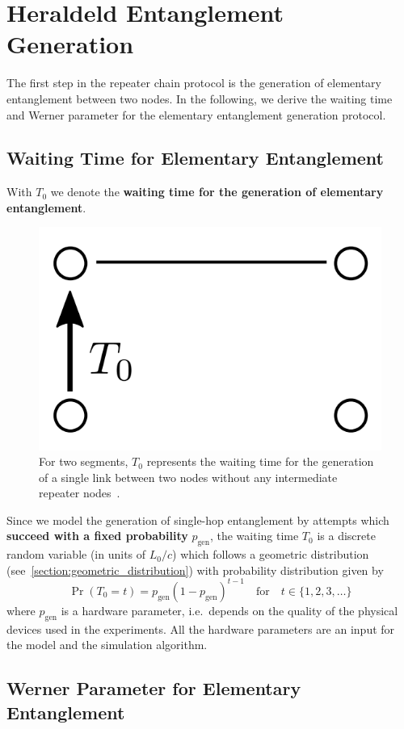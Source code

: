 \documentclass{masterthesis}
\begin{document}
\section{Heraldeld Entanglement Generation}\label{section:heralded_entanglement_generation}

The first step in the repeater chain protocol is the generation of elementary entanglement between two nodes.
In the following, we derive the waiting time and Werner parameter for the elementary entanglement generation protocol.

\subsection{Waiting Time for Elementary Entanglement}

With $T_0$ we denote the \textbf{waiting time for the generation of elementary entanglement}.

\begin{figure}[ht]
    \centering
    \includegraphics[width=0.2\linewidth]{images/gen.png}
    \caption{For two segments, $T_0$ represents the waiting time for the generation of a single link between two nodes without any intermediate repeater nodes~\cite{Li_2021}.}\label{fig:gen}
\end{figure}

Since we model the generation of single-hop entanglement by attempts which \textbf{succeed with a fixed probability} $p_{\text{gen}}$, the waiting time $T_0$ is a discrete random variable (in units of $L_0 /c$) which follows a geometric distribution (see~\ref{section:geometric_distribution}) with probability distribution given by 
\begin{equation}
    \Pr(T_0 = t) = p_{\text{gen}} {(1 - p_{\text{gen}})}^{t-1} \quad \text{for} \quad t \in \{1, 2, 3, \ldots \}
\end{equation}
where $p_{\text{gen}}$ is a hardware parameter, i.e.\ depends on the quality of the physical devices used in the experiments.
All the hardware parameters are an input for the model and the simulation algorithm.

\subsection{Werner Parameter for Elementary Entanglement}\label{subsection:werner_parameter_gen}
\end{document}
